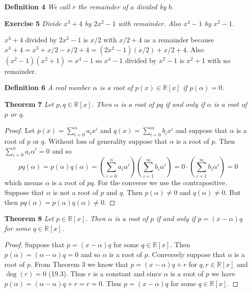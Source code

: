 \documentclass{article}
\begin{document}
\begin{flushleft}
\textbf{Definition 4}
\textsl{We call $r$ the remainder of $a$ divided by $b$.}\newline

\textbf{Exercise 5}
\textsl{Divide $x^3 + 4$ by $2x^2 - 1$ with remainder. Also $x^4-1$ by $x^2 - 1$.}\newline

$x^3+4$ divided by $2x^2-1$ is $x/2$ with $x/2+4$ as a remainder because $x^3+4 = x^3 + x/2 - x/2 + 4 = (2x^2-1)(x/2) + x/2+4$. Also $(x^2-1)(x^2+1) = x^4-1$ so $x^4-1$ divided by $x^2-1$ is $x^2+1$ with no remainder.\newline

\textbf{Definition 6}
\textsl{A real number $\alpha$ is a root of $p(x) \in \mathbb{R}[x]$ if $p(\alpha) = 0$.}\newline

\textbf{Theorem 7}
\textsl{Let $p,q \in \mathbb{R}[x]$. Then $\alpha$ is a root of $pq$ if and only if $\alpha$ is a root of $p$ or $q$.}
\begin{proof}
Let $p(x) = \sum_{i=0}^n a_i x^i$ and $q(x) = \sum_{i=0}^m b_i x^i$ and suppose that $\alpha$ is a root of $p$ or $q$. Without loss of generality suppose that $\alpha$ is a root of $p$. Then $\sum_{i=0}^n a_i \alpha^i = 0$ and so
\[
pq(\alpha) = p(\alpha) q(\alpha) = \left ( \sum_{i=0}^n a_i \alpha^i \right ) \left( \sum_{i=1}^m b_i \alpha^i \right ) = 0 \cdot \left ( \sum_{i=1}^m b_i \alpha^i \right ) = 0
\]
which means $\alpha$ is a root of $pq$. For the converse we use the contrapositive. Suppose that $\alpha$ is not a root of $p$ and $q$. Then $p(\alpha) \neq 0$ and $q(\alpha) \neq 0$. But then $pq(\alpha) = p(\alpha) q(\alpha) \neq 0$.
\end{proof}

\textbf{Theorem 8}
\textsl{Let $p \in \mathbb{R}[x]$. Then $\alpha$ is a root of $p$ if and only if $p = (x-\alpha)q$ for some $q \in \mathbb{R}[x]$.}
\begin{proof}
Suppose that $p = (x - \alpha)q$ for some $q \in \mathbb{R}[x]$. Then $p(\alpha) = (\alpha-\alpha)q = 0$ and so $\alpha$ is a root of $p$. Conversely suppose that $\alpha$ is a root of $p$. From Theorem 3 we know that $p = (x-\alpha)q + r$ for $q,r \in \mathbb{R}[x]$ and $\deg (r) = 0$ (19.3). Thus $r$ is a constant and since $\alpha$ is a root of $p$ we have $p(\alpha) = (\alpha - \alpha)q + r = r = 0$. Thus $p = (x-\alpha)q$ for some $q \in \mathbb{R}[x]$.
\end{proof}


\end{flushleft}
\end{document}
